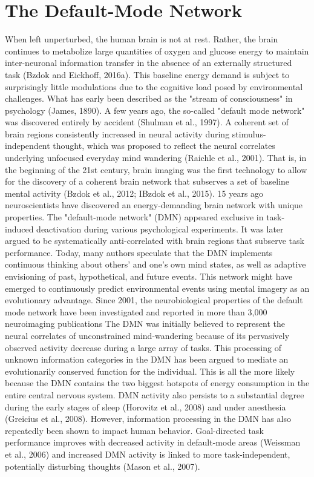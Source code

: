 \documentclass{article} %
\begin{document}
\section{The Default-Mode Network}
%
When left unperturbed, the human brain is not at rest. Rather, the brain continues to metabolize large quantities of oxygen and glucose energy to maintain inter-neuronal information transfer in the absence of an externally structured task (Bzdok and Eickhoff, 2016a). This baseline energy demand is subject to surprisingly little modulations due to the cognitive load posed by environmental challenges. What has early been described as the "stream of consciousness" in psychology (James, 1890).
%
A few years ago, the so-called "default mode network" was discovered entirely by accident (Shulman et al., 1997). A coherent set of brain regions consistently increased in neural activity during stimulus-independent thought, which was proposed to reflect the neural correlates underlying unfocused everyday mind wandering (Raichle et al., 2001). That is, in the beginning of the 21st century, brain imaging was the first technology to allow for the discovery of a coherent brain network that subserves a set of baseline mental activity (Bzdok et al., 2012; IBzdok et al., 2015).
%
15 years ago neuroscientists have discovered an energy-demanding brain network with unique properties. The "default-mode network" (DMN) appeared exclusive in task-induced deactivation during various psychological experiments. It was later argued to be systematically anti-correlated with brain regions that subserve task performance. Today, many authors speculate that the DMN implements continuous thinking about others’ and one’s own mind states, as well as adaptive envisioning of past, hypothetical, and future events. This network might have emerged to continuously predict environmental events using mental imagery as an evolutionary advantage.
%
Since 2001, the neurobiological properties of the default mode network have been investigated and reported in more than 3,000 neuroimaging publications 
The DMN was initially believed to represent the neural correlates of unconstrained mind-wandering because of its pervasively observed activity decrease during a large array of tasks. This processing of unknown information categories in the DMN has been argued to mediate an evolutionarily conserved function for the individual. This is all the more likely because the DMN contains the two biggest hotspots of energy consumption in the entire central nervous system. DMN activity also persists to a substantial degree during the early stages of sleep (Horovitz et al., 2008) and under anesthesia (Greicius et al., 2008). However, information processing in the DMN has also repeatedly been shown to impact human behavior. Goal-directed task performance improves with decreased activity in default-mode areas (Weissman et al., 2006) and increased DMN activity is linked to more task-independent, potentially disturbing thoughts (Mason et al., 2007). 
\end{document}
